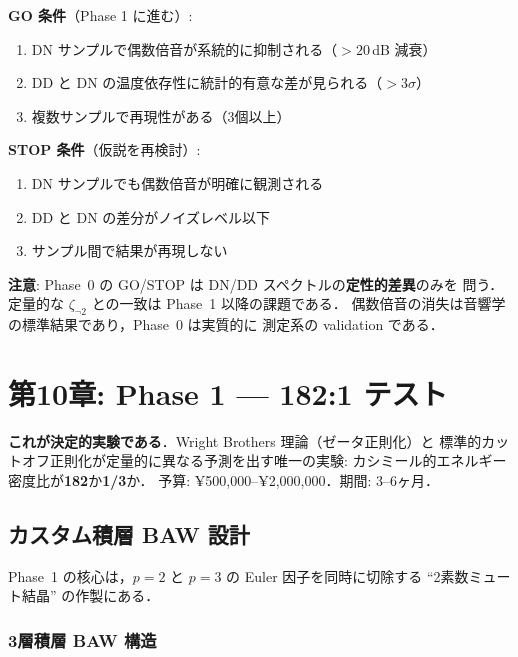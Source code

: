 \documentclass[11pt,a4paper]{article}
\begin{document}
\begin{gostopbox}
\textbf{GO 条件}（Phase 1 に進む）:
\begin{enumerate}
\item DN サンプルで偶数倍音が系統的に抑制される（$> 20$\,dB 減衰）
\item DD と DN の温度依存性に統計的有意な差が見られる（$> 3\sigma$）
\item 複数サンプルで再現性がある（3個以上）
\end{enumerate}

\textbf{STOP 条件}（仮説を再検討）:
\begin{enumerate}
\item DN サンプルでも偶数倍音が明確に観測される
\item DD と DN の差分がノイズレベル以下
\item サンプル間で結果が再現しない
\end{enumerate}

\textbf{注意}: Phase~0 の GO/STOP は DN/DD スペクトルの\textbf{定性的差異}のみを
問う．定量的な $\zeta_{\neg 2}$ との一致は Phase~1 以降の課題である．
偶数倍音の消失は音響学の標準結果であり，Phase~0 は実質的に
測定系の validation である．
\end{gostopbox}

\newpage
\section{第10章: Phase 1 — 182:1 テスト}

\begin{experimentbox}
\textbf{これが決定的実験である}．Wright Brothers 理論（ゼータ正則化）と
標準的カットオフ正則化が定量的に異なる予測を出す唯一の実験:
カシミール的エネルギー密度比が\textbf{182}か\textbf{1/3}か．
予算: ¥500,000--¥2,000,000．期間: 3--6ヶ月．
\end{experimentbox}

\subsection{カスタム積層 BAW 設計}

Phase~1 の核心は，$p=2$ と $p=3$ の Euler 因子を同時に切除する
``2素数ミュート結晶'' の作製にある．

\subsubsection{3層積層 BAW 構造}
\end{document}
